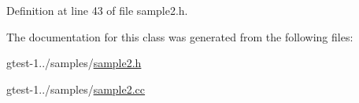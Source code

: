 \-Definition at line 43 of file sample2.\-h.



\-The documentation for this class was generated from the following files\-:\begin{DoxyCompactItemize}
\item 
gtest-\/1../samples/\hyperlink{sample2_8h}{sample2.\-h}\item 
gtest-\/1../samples/\hyperlink{sample2_8cc}{sample2.\-cc}\end{DoxyCompactItemize}
